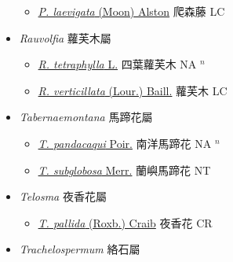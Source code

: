 \begin{itemize}
  \begin{itemize}
        \item[] \href{http://www.theplantlist.org/tpl1.1/search?q=Parsonia+laevigata}{\textit{P. laevigata} (Moon) Alston}   爬森藤 LC
  \end{itemize}
 \item[] \textit{Rauvolfia} 蘿芙木屬
                    
  \begin{itemize}
        \item[] \href{http://www.theplantlist.org/tpl1.1/search?q=Rauvolfia+tetraphylla}{\textit{R. tetraphylla} L.}   四葉蘿芙木 NA $^n$
        \item[] \href{http://www.theplantlist.org/tpl1.1/search?q=Rauvolfia+verticillata}{\textit{R. verticillata} (Lour.) Baill.}   蘿芙木 LC
  \end{itemize}
 \item[] \textit{Tabernaemontana} 馬蹄花屬
                    
  \begin{itemize}
        \item[] \href{http://www.theplantlist.org/tpl1.1/search?q=Tabernaemontana+pandacaqui}{\textit{T. pandacaqui} Poir.}   南洋馬蹄花 NA $^n$
        \item[] \href{http://www.theplantlist.org/tpl1.1/search?q=Tabernaemontana+subglobosa}{\textit{T. subglobosa} Merr.}   蘭嶼馬蹄花 NT
  \end{itemize}
 \item[] \textit{Telosma} 夜香花屬
                    
  \begin{itemize}
        \item[] \href{http://www.theplantlist.org/tpl1.1/search?q=Telosma+pallida}{\textit{T. pallida} (Roxb.) Craib}   夜香花 CR
  \end{itemize}
 \item[] \textit{Trachelospermum} 絡石屬
                    

\end{itemize}
